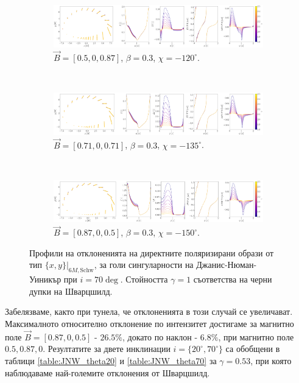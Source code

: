 \begin{figure}[!htb]
	\centering
	\begin{subfigure}{12cm}
	\hspace{-0.25cm}
	\includegraphics[scale = 0.13]{JNW_delta_figs_B_0.5_0.0_0.87_70_deg_direct.png}
	\caption{$\vec{B} = [0.5, 0, 0.87]$, $\beta = 0.3$, $\chi = -120^\circ$.}
\end{subfigure}\\
\begin{subfigure}{12cm}
	\hspace{-0.25cm}
	\includegraphics[scale = 0.13]{JNW_delta_figs_B_0.71_0.0_0.71_70_deg_direct.png}
	\caption{$\vec{B} = [0.71, 0, 0.71]$, $\beta = 0.3$, $\chi = -135^\circ$.}
\end{subfigure}\\
\begin{subfigure}{12cm}
	\hspace{-0.25cm}
	\includegraphics[scale = 0.13]{JNW_delta_figs_B_0.87_0.0_0.5_70_deg_direct.png}
	\caption{$\vec{B} = [0.87, 0, 0.5]$, $\beta = 0.3$, $\chi = -150^\circ$.}
\end{subfigure}
	\caption[Профили на отклоненията на директните поляризирани образи oт тип $\{x,y\}\vert_{6M, \text{Schw}}$, за $i = 70\deg$ за голи сингуларности на Джанис-Нюман-Уиникър.]{\small Профили на отклоненията на директните поляризирани образи от тип $\{x,y\}\vert_{6M, \text{Schw}}$, за голи сингуларности на Джанис-Нюман-Уиникър при $i = 70\deg$. Стойността $\gamma = 1$ съответства на черни дупки на Шварцшилд.} 
	\label{JNW_delta_r6_70_deg}
\end{figure}
Забелязваме, както при тунела, че отклоненията в този случай се увеличават. Максималното относително отклонение по интензитет достигаме за магнитно поле $\vec{B} = [0.87,0,0.5]$ - $26.5\%$, докато по наклон - $6.8\%$, при магнитно поле $0.5, 0.87, 0$. Резултатите за двете инклинации $i = \{20^\circ, 70^\circ\}$ са обобщени в таблици \ref{table:JNW_theta20} и \ref{table:JNW_theta70} за $\gamma = 0.53$, при която наблюдаваме най-големите отклонения от Шварцшилд.


